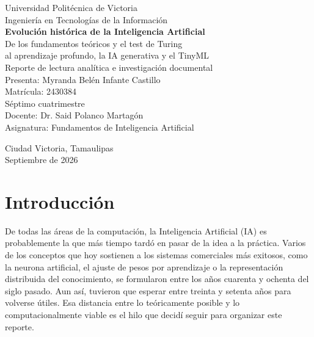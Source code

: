 \documentclass[12pt,letterpaper,oneside]{article}
\begin{document}
\begin{titlepage}
\centering
\vspace*{1.5cm}

{\large Universidad Politécnica de Victoria}\\[0.3cm]
{\normalsize Ingeniería en Tecnologías de la Información}\\[3cm]

{\LARGE\bfseries Evolución histórica de la Inteligencia Artificial}\\[0.6cm]
{\large De los fundamentos teóricos y el test de Turing\\
al aprendizaje profundo, la IA generativa y el TinyML}\\[2.5cm]

{\large Reporte de lectura analítica e investigación documental}\\[3cm]

{\normalsize
Presenta: Myranda Belén Infante Castillo\\[0.2cm]
Matrícula: 2430384\\[0.2cm]
Séptimo cuatrimestre\\[1.2cm]
Docente: Dr. Said Polanco Martagón\\[0.2cm]
Asignatura: Fundamentos de Inteligencia Artificial}

\vfill

{\normalsize Ciudad Victoria, Tamaulipas\\ Septiembre de 2026}

\end{titlepage}

\setcounter{page}{2}
\tableofcontents
\newpage


\section{Introducción}

De todas las áreas de la computación, la Inteligencia Artificial (IA) es probablemente la que más tiempo tardó en pasar de la idea a la práctica. Varios de los conceptos que hoy sostienen a los sistemas comerciales más exitosos, como la neurona artificial, el ajuste de pesos por aprendizaje o la representación distribuida del conocimiento, se formularon entre los años cuarenta y ochenta del siglo pasado. Aun así, tuvieron que esperar entre treinta y setenta años para volverse útiles. Esa distancia entre lo teóricamente posible y lo computacionalmente viable es el hilo que decidí seguir para organizar este reporte.
\end{document}
